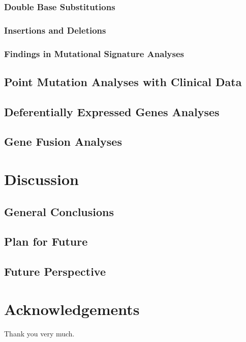 \documentclass[11pt,a4paper,onecolumn,oneside]{report}
\begin{document}
            \subsubsection{Double Base Substitutions}

            \subsubsection{Insertions and Deletions}

            \subsubsection{Findings in Mutational Signature Analyses}

        \subsection{Point Mutation Analyses with Clinical Data}

        \subsection{Deferentially Expressed Genes Analyses}

        \subsection{Gene Fusion Analyses}

    \pagebreak

    \section{Discussion}
        \subsection{General Conclusions}

        \subsection{Plan for Future}

        \subsection{Future Perspective}

    \pagebreak

    
    
    \pagebreak

    \section*{\hfill \Large Acknowledgements \hfill}
        Thank you very much.
    \pagebreak

    \hbox{}
    \thispagestyle{empty}
    \pagebreak
\end{document}
